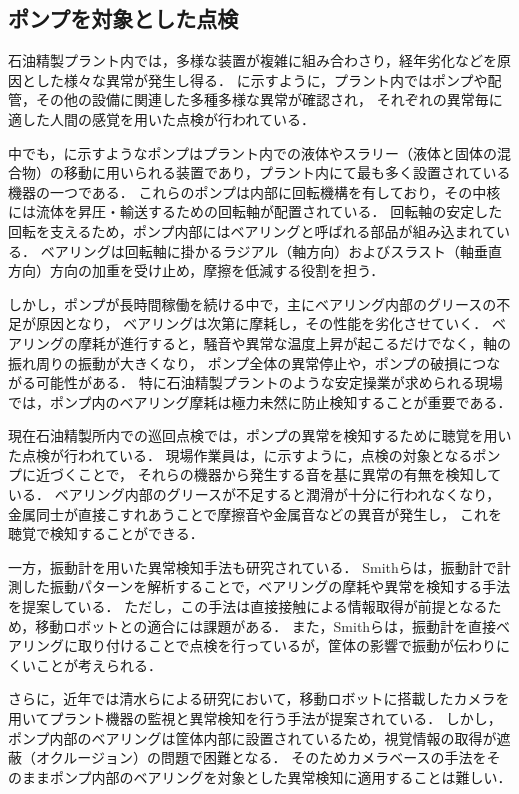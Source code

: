 \documentclass[../main]{subfiles}
\begin{document}
\subsection{ポンプを対象とした点検}
\label{sec:intro_plant_characteristics}


石油精製プラント内では，多様な装置が複雑に組み合わさり，経年劣化などを原因とした様々な異常が発生し得る．
に示すように，プラント内ではポンプや配管，その他の設備に関連した多種多様な異常が確認され，
それぞれの異常毎に適した人間の感覚を用いた点検が行われている．


中でも，に示すようなポンプはプラント内での液体やスラリー（液体と固体の混合物）の移動に用いられる装置であり，プラント内にて最も多く設置されている機器の一つである．
これらのポンプは内部に回転機構を有しており，その中核には流体を昇圧・輸送するための回転軸が配置されている．
回転軸の安定した回転を支えるため，ポンプ内部にはベアリングと呼ばれる部品が組み込まれている．
ベアリングは回転軸に掛かるラジアル（軸方向）およびスラスト（軸垂直方向）方向の加重を受け止め，摩擦を低減する役割を担う．

しかし，ポンプが長時間稼働を続ける中で，主にベアリング内部のグリースの不足が原因となり，
ベアリングは次第に摩耗し，その性能を劣化させていく．
ベアリングの摩耗が進行すると，騒音や異常な温度上昇が起こるだけでなく，軸の振れ周りの振動が大きくなり，
ポンプ全体の異常停止や，ポンプの破損につながる可能性がある．
特に石油精製プラントのような安定操業が求められる現場では，ポンプ内のベアリング摩耗は極力未然に防止検知することが重要である．

現在石油精製所内での巡回点検では，ポンプの異常を検知するために聴覚を用いた点検が行われている．
現場作業員は，に示すように，点検の対象となるポンプに近づくことで，
それらの機器から発生する音を基に異常の有無を検知している．
ベアリング内部のグリースが不足すると潤滑が十分に行われなくなり，金属同士が直接こすれあうことで摩擦音や金属音などの異音が発生し，
これを聴覚で検知することができる．

一方，振動計を用いた異常検知手法も研究されている\cite{SMITH2015100}．
Smithらは，振動計で計測した振動パターンを解析することで，ベアリングの摩耗や異常を検知する手法を提案している．
ただし，この手法は直接接触による情報取得が前提となるため，移動ロボットとの適合には課題がある．
また，Smithらは，振動計を直接ベアリングに取り付けることで点検を行っているが，筐体の影響で振動が伝わりにくいことが考えられる．


さらに，近年では清水らによる研究において，移動ロボットに搭載したカメラを用いてプラント機器の監視と異常検知を行う手法が提案されている．\cite{shimizu2024change}
しかし，ポンプ内部のベアリングは筐体内部に設置されているため，視覚情報の取得が遮蔽（オクルージョン）の問題で困難となる．
そのためカメラベースの手法をそのままポンプ内部のベアリングを対象とした異常検知に適用することは難しい．
\end{document}
